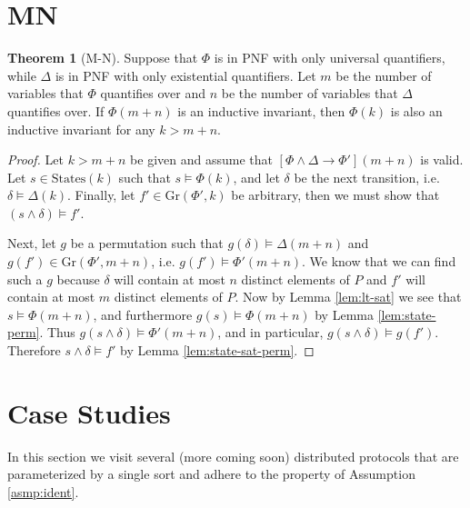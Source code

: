 \documentclass[12pt]{article}
\theoremstyle{definition}
\newtheorem{theorem}{Theorem}
\theoremstyle{remark}
\newcommand{\states}{\text{States}}
\newcommand{\gr}{\text{Gr}}
\begin{document}
\section{MN}
\begin{theorem}[M-N]
  Suppose that $\Phi$ is in PNF with only universal quantifiers, while $\Delta$ is in PNF with only existential quantifiers.  Let $m$ be the number of variables that $\Phi$ quantifies over and $n$ be the number of variables that $\Delta$ quantifies over.  If $\Phi(m+n)$ is an inductive invariant, then $\Phi(k)$ is also an inductive invariant for any $k>m+n$.
\end{theorem}
\begin{proof}
  Let $k>m+n$ be given and assume that $[\Phi\land\Delta \rightarrow \Phi'](m+n)$ is valid.  Let $s \in \states(k)$ such that $s \models \Phi(k)$, and let $\delta$ be the next transition, i.e. $\delta \models \Delta(k)$.  Finally, let $f' \in \gr(\Phi',k)$ be arbitrary, then we must show that $(s \land \delta) \models f'$.

  Next, let $g$ be a permutation such that $g(\delta) \models \Delta(m+n)$ and $g(f') \in \gr(\Phi',m+n)$, i.e. $g(f') \models \Phi'(m+n)$.  We know that we can find such a $g$ because $\delta$ will contain at most $n$ distinct elements of $P$ and $f'$ will contain at most $m$ distinct elements of $P$.  Now by Lemma \ref{lem:lt-sat} we see that $s \models \Phi(m+n)$, and furthermore $g(s) \models \Phi(m+n)$ by Lemma \ref{lem:state-perm}.  Thus $g(s \land \delta) \models \Phi'(m+n)$, and in particular, $g(s \land \delta) \models g(f')$.  Therefore $s \land \delta \models f'$ by Lemma \ref{lem:state-sat-perm}.
\end{proof}



\section{Case Studies}
In this section we visit several (more coming soon) distributed protocols that are parameterized by a single sort and adhere to the property of Assumption \ref{asmp:ident}.
\end{document}
